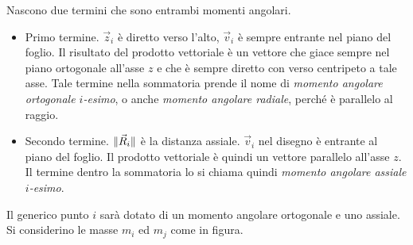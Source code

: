 \documentclass[10pt,a4paper]{book}
\DeclarePairedDelimiter{\norma}{\lVert}{\rVert} %
\begin{document}
Nascono due termini che sono entrambi momenti angolari.
\begin{itemize}
	\item Primo termine. $\vec{z}_i$ è diretto verso l'alto, $\vec{v}_i$ è sempre entrante nel piano del foglio. Il risultato del prodotto vettoriale è un vettore che giace sempre nel piano ortogonale all'asse $z$ e che è sempre diretto con verso centripeto a tale asse. Tale termine nella sommatoria prende il nome di \emph{momento angolare ortogonale $i$-esimo}, o anche \emph{momento angolare radiale}, perché è parallelo al raggio.
	\item Secondo termine. $\norma{\vec{R}_i}$ è la distanza assiale. $\vec{v}_i$ nel disegno è entrante al piano del foglio. Il prodotto vettoriale è quindi un vettore parallelo all'asse $z$. Il termine dentro la sommatoria lo si chiama quindi \emph{momento angolare assiale $i$-esimo}.
\end{itemize}
Il generico punto $i$ sarà dotato di un momento angolare ortogonale e uno assiale. Si considerino le masse $m_i$ ed $m_j$ come in figura.
\end{document}
